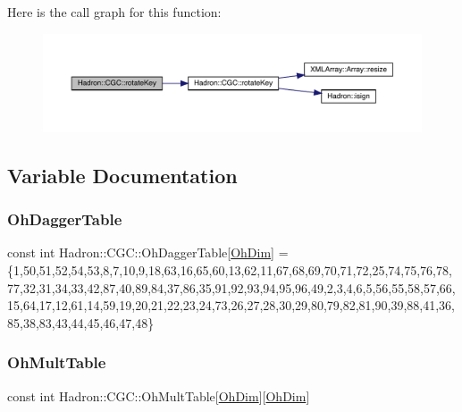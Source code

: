 Here is the call graph for this function\+:
\nopagebreak
\begin{figure}[H]
\begin{center}
\leavevmode
\includegraphics[width=350pt]{d9/d19/namespaceHadron_1_1CGC_ad5f1f6f8b8dd82238f3efeb03d1dc6e5_cgraph}
\end{center}
\end{figure}


\subsection{Variable Documentation}
\mbox{\label{namespaceHadron_1_1CGC_af366e5e97395d0d95377898177cdbb79}} 
\subsubsection{\texorpdfstring{OhDaggerTable}{OhDaggerTable}}
{\footnotesize\ttfamily const int Hadron\+::\+C\+G\+C\+::\+Oh\+Dagger\+Table\mbox{[}\mbox{\hyperlink{namespaceHadron_a2bea98b7ecd13619ef78b6d204d59707}{Oh\+Dim}}\mbox{]} = \{1,50,51,52,54,53,8,7,10,9,18,63,16,65,60,13,62,11,67,68,69,70,71,72,25,74,75,76,78,77,32,31,34,33,42,87,40,89,84,37,86,35,91,92,93,94,95,96,49,2,3,4,6,5,56,55,58,57,66,15,64,17,12,61,14,59,19,20,21,22,23,24,73,26,27,28,30,29,80,79,82,81,90,39,88,41,36,85,38,83,43,44,45,46,47,48\}}

\mbox{\label{namespaceHadron_1_1CGC_a7737922afb0c060e8cc522adbb5b2723}} 
\subsubsection{\texorpdfstring{OhMultTable}{OhMultTable}}
{\footnotesize\ttfamily const int Hadron\+::\+C\+G\+C\+::\+Oh\+Mult\+Table\mbox{[}\mbox{\hyperlink{namespaceHadron_a2bea98b7ecd13619ef78b6d204d59707}{Oh\+Dim}}\mbox{]}\mbox{[}\mbox{\hyperlink{namespaceHadron_a2bea98b7ecd13619ef78b6d204d59707}{Oh\+Dim}}\mbox{]}}

